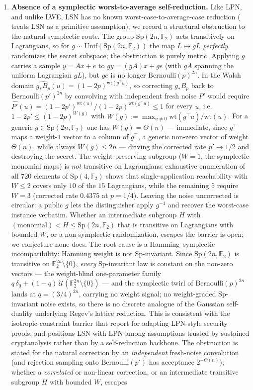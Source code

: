 \documentclass[11pt,a4paper]{article}
\theoremstyle{plain}
\theoremstyle{definition}
\newcommand{\F}{\mathbb{F}}
\begin{document}
\begin{enumerate}
\item \textbf{Absence of a symplectic worst-to-average self-reduction.} Like LPN, and unlike LWE, LSN has no known worst-case-to-average-case reduction ( treats LSN as a primitive assumption); we record a structural obstruction to the natural symplectic route. The group $\mathrm{Sp}(2n,\F_2)$ acts transitively on Lagrangians, so for $g\sim\mathrm{Unif}(\mathrm{Sp}(2n,\F_2))$ the map $L\mapsto gL$ \emph{perfectly} randomizes the secret subspace; the obstruction is purely metric. Applying $g$ carries a sample $y=Ax+e$ to $gy=(gA)x+ge$ (with $gA$ spanning the uniform Lagrangian $gL$), but $ge$ is no longer $\mathrm{Bernoulli}(p)^{2n}$. In the Walsh domain $\widehat{g_*B_p}(u)=(1-2p)^{\mathrm{wt}(g^{\top}u)}$, so correcting $g_*B_p$ back to $\mathrm{Bernoulli}(p')^{2n}$ by convolving with independent fresh noise $P'$ would require $\widehat{P'}(u)=(1-2p')^{\mathrm{wt}(u)}/(1-2p)^{\mathrm{wt}(g^{\top}u)}\le 1$ for every $u$, i.e.\ $1-2p'\le(1-2p)^{W(g)}$ with $W(g):=\max_{u\neq 0}\mathrm{wt}(g^{\top}u)/\mathrm{wt}(u)$. For a generic $g\in\mathrm{Sp}(2n,\F_2)$ one has $W(g)=\Theta(n)$ --- immediate, since $g^{\top}$ maps a weight-$1$ vector to a column of $g^{\top}$, a generic non-zero vector of weight $\Theta(n)$, while always $W(g)\le 2n$ --- driving the corrected rate $p'\to 1/2$ and destroying the secret. The weight-preserving subgroup ($W=1$, the symplectic monomial maps) is \emph{not} transitive on Lagrangians: exhaustive enumeration of all $720$ elements of $\mathrm{Sp}(4,\F_2)$ shows that single-application reachability with $W\le 2$ covers only $10$ of the $15$ Lagrangians, while the remaining $5$ require $W=3$ (corrected rate $0.4375$ at $p=1/4$). Leaving the noise uncorrected is circular: a public $g$ lets the distinguisher apply $g^{-1}$ and recover the worst-case instance verbatim. Whether an intermediate subgroup $H$ with $\mathrm{(monomial)}<H\le\mathrm{Sp}(2n,\F_2)$ that is transitive on Lagrangians with bounded $W$, or a non-symplectic randomization, escapes the barrier is open; we conjecture none does. The root cause is a Hamming--symplectic incompatibility: Hamming weight is not $\mathrm{Sp}$-invariant. Since $\mathrm{Sp}(2n,\F_2)$ is transitive on $\F_2^{2n}\setminus\{0\}$, \emph{every} $\mathrm{Sp}$-invariant law is constant on the non-zero vectors --- the weight-blind one-parameter family $q\,\delta_0+(1-q)\,\mathcal U(\F_2^{2n}\setminus\{0\})$ --- and the symplectic twirl of $\mathrm{Bernoulli}(p)^{2n}$ lands at $q=(3/4)^{2n}$, carrying no weight signal; no weight-graded $\mathrm{Sp}$-invariant noise exists, so there is no discrete analogue of the Gaussian self-duality underlying Regev's lattice reduction. This is consistent with the isotropic-constraint barrier that \cite{LPQR26} report for adapting LPN-style security proofs, and positions LSN with LPN among assumptions trusted by sustained cryptanalysis rather than by a self-reduction backbone. The obstruction is stated for the natural correction by an \emph{independent} fresh-noise convolution (and rejection sampling onto $\mathrm{Bernoulli}(p')$ has acceptance $2^{-\Theta(n)}$); whether a \emph{correlated} or non-linear correction, or an intermediate transitive subgroup $H$ with bounded $W$, escapes 
\end{enumerate}
\end{document}
